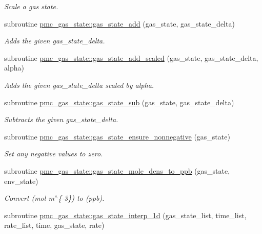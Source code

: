 \begin{DoxyCompactItemize}
\begin{DoxyCompactList}\small\item\em Scale a gas state. \end{DoxyCompactList}\item 
subroutine \mbox{\hyperlink{namespacepmc__gas__state_ae81c12f010adf0cbed8104e5f7ecfca0}{pmc\+\_\+gas\+\_\+state\+::gas\+\_\+state\+\_\+add}} (gas\+\_\+state, gas\+\_\+state\+\_\+delta)
\begin{DoxyCompactList}\small\item\em Adds the given gas\+\_\+state\+\_\+delta. \end{DoxyCompactList}\item 
subroutine \mbox{\hyperlink{namespacepmc__gas__state_aad52ea70d41084b337a37173e58e1c4a}{pmc\+\_\+gas\+\_\+state\+::gas\+\_\+state\+\_\+add\+\_\+scaled}} (gas\+\_\+state, gas\+\_\+state\+\_\+delta, alpha)
\begin{DoxyCompactList}\small\item\em Adds the given {\ttfamily gas\+\_\+state\+\_\+delta} scaled by {\ttfamily alpha}. \end{DoxyCompactList}\item 
subroutine \mbox{\hyperlink{namespacepmc__gas__state_a0ee905bb7dd2b8e8a576ea04e0f7b699}{pmc\+\_\+gas\+\_\+state\+::gas\+\_\+state\+\_\+sub}} (gas\+\_\+state, gas\+\_\+state\+\_\+delta)
\begin{DoxyCompactList}\small\item\em Subtracts the given gas\+\_\+state\+\_\+delta. \end{DoxyCompactList}\item 
subroutine \mbox{\hyperlink{namespacepmc__gas__state_a19baf5dd776198d429d632a7749e734f}{pmc\+\_\+gas\+\_\+state\+::gas\+\_\+state\+\_\+ensure\+\_\+nonnegative}} (gas\+\_\+state)
\begin{DoxyCompactList}\small\item\em Set any negative values to zero. \end{DoxyCompactList}\item 
subroutine \mbox{\hyperlink{namespacepmc__gas__state_a418fa0d971e5c3f84a8f7f90b1da4ac7}{pmc\+\_\+gas\+\_\+state\+::gas\+\_\+state\+\_\+mole\+\_\+dens\+\_\+to\+\_\+ppb}} (gas\+\_\+state, env\+\_\+state)
\begin{DoxyCompactList}\small\item\em Convert (mol m$^\wedge$\{-\/3\}) to (ppb). \end{DoxyCompactList}\item 
subroutine \mbox{\hyperlink{namespacepmc__gas__state_ab70d882ec5ebc99127b4e815278cb15a}{pmc\+\_\+gas\+\_\+state\+::gas\+\_\+state\+\_\+interp\+\_\+1d}} (gas\+\_\+state\+\_\+list, time\+\_\+list, rate\+\_\+list, time, gas\+\_\+state, rate)

\end{DoxyCompactItemize}

